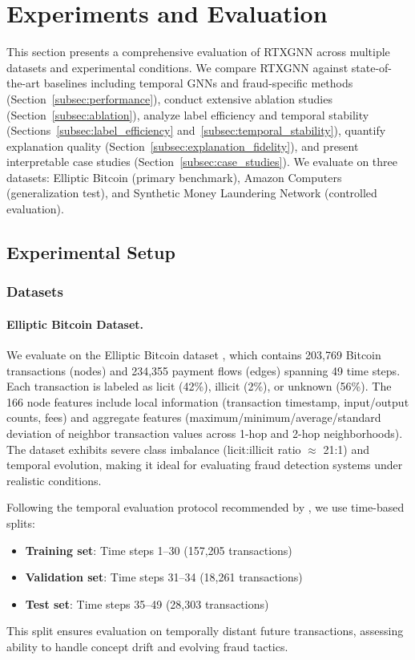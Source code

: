 \section{Experiments and Evaluation}
\label{sec:experiments}

This section presents a comprehensive evaluation of RTXGNN across multiple datasets and experimental conditions. We compare RTXGNN against state-of-the-art baselines including temporal GNNs and fraud-specific methods (Section~\ref{subsec:performance}), conduct extensive ablation studies (Section~\ref{subsec:ablation}), analyze label efficiency and temporal stability (Sections~\ref{subsec:label_efficiency} and~\ref{subsec:temporal_stability}), quantify explanation quality (Section~\ref{subsec:explanation_fidelity}), and present interpretable case studies (Section~\ref{subsec:case_studies}). We evaluate on three datasets: Elliptic Bitcoin (primary benchmark), Amazon Computers (generalization test), and Synthetic Money Laundering Network (controlled evaluation).

\subsection{Experimental Setup}
\label{subsec:experimental_setup}

\subsubsection{Datasets}

\paragraph{Elliptic Bitcoin Dataset.} We evaluate on the Elliptic Bitcoin dataset \citep{weber2019anti}, which contains 203,769 Bitcoin transactions (nodes) and 234,355 payment flows (edges) spanning 49 time steps. Each transaction is labeled as licit (42\%), illicit (2\%), or unknown (56\%). The 166 node features include local information (transaction timestamp, input/output counts, fees) and aggregate features (maximum/minimum/average/standard deviation of neighbor transaction values across 1-hop and 2-hop neighborhoods). The dataset exhibits severe class imbalance (licit:illicit ratio $\approx$ 21:1) and temporal evolution, making it ideal for evaluating fraud detection systems under realistic conditions.

Following the temporal evaluation protocol recommended by \citep{weber2019anti}, we use time-based splits:
\begin{itemize}
    \item \textbf{Training set}: Time steps 1--30 (157,205 transactions)
    \item \textbf{Validation set}: Time steps 31--34 (18,261 transactions)
    \item \textbf{Test set}: Time steps 35--49 (28,303 transactions)
\end{itemize}
This split ensures evaluation on temporally distant future transactions, assessing ability to handle concept drift and evolving fraud tactics.

